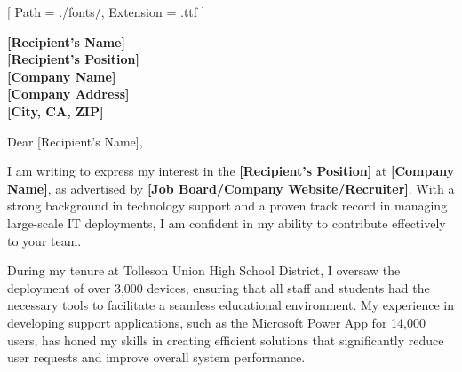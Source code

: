 

\newcommand{\RecipientName}{[Recipient's Name]}
\newcommand{\RecipientPosition}{[Recipient's Position]}
\newcommand{\CompanyName}{[Company Name]}
\newcommand{\CompanyAddress}{[Company Address]}
\newcommand{\CompanyCityStateZIP}{[City, CA, ZIP]}
\newcommand{\JobSource}{[Job Board/Company Website/Recruiter]}
\newcommand{\SpecificReason}{[Specific reason related to the company or position]}

\renewcommand{\photo}[2]{}
\renewcommand{\marginpar}[1]{}

\geometry{
  left=2cm,
  right=2cm,
  top=2cm,
  bottom=2cm,
  portrait
}

\setmainfont{NotoSans-Regular}[
  Path = ./fonts/,
  Extension = .ttf
]




\makecvheader

\vspace{1cm}

\textbf{\RecipientName} \\
\textbf{\RecipientPosition} \\
\textbf{\CompanyName} \\
\textbf{\CompanyAddress} \\
\textbf{\CompanyCityStateZIP}

\vspace{0.5cm}

\noindent Dear \RecipientName,

\vspace{0.5cm}

\justifying

I am writing to express my interest in the \textbf{\RecipientPosition} at \textbf{\CompanyName}, as advertised by \textbf{\JobSource}. With a strong background in technology support and a proven track record in managing large-scale IT deployments, I am confident in my ability to contribute effectively to your team.

During my tenure at Tolleson Union High School District, I oversaw the deployment of over 3,000 devices, ensuring that all staff and students had the necessary tools to facilitate a seamless educational environment. My experience in developing support applications, such as the Microsoft Power App for 14,000 users, has honed my skills in creating efficient solutions that significantly reduce user requests and improve overall system performance.

